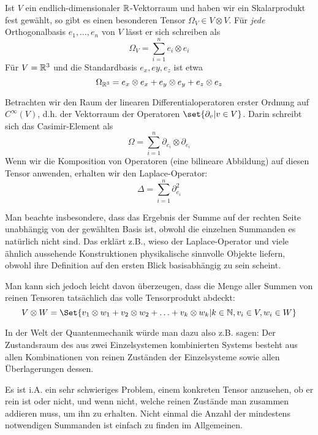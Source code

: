 \begin{example}\label{tensoren:casimir_element}
Ist $V$ ein endlich-dimensionaler $\mathbb{R}$-Vektorraum und haben wir ein Skalarprodukt fest gewählt, so gibt es einen besonderen Tensor $\Omega_V \in V\otimes V$. Für \textit{jede} Orthogonalbasis $e_1, \ldots, e_n$ von $V$ lässt er sich schreiben als
\[\Omega_V = \sum_{i=1}^n e_i \otimes e_i\]
Für $V=\mathbb{R}^3$ und die Standardbasis $e_x, ey, e_z$ ist etwa
\[\Omega_{\mathbb{R}^3} = e_x\otimes e_x + e_y\otimes e_y + e_z\otimes e_z\]

Betrachten wir den Raum der linearen Differentialoperatoren erster Ordnung auf $C^\infty(V)$, d.h. der Vektorraum der Operatoren $\set{\partial_v | v\in V}$. Darin schreibt sich das Casimir-Element als
\[\Omega = \sum_{i=1}^n \partial_{e_i} \otimes \partial_{e_i}\]
Wenn wir die Komposition von Operatoren (eine bilineare Abbildung) auf diesen Tensor anwenden, erhalten wir den Laplace-Operator:
\[\Delta = \sum_{i=1}^n \partial_{e_i}^2\]

Man beachte insbesondere, dass das Ergebnis der Summe auf der rechten Seite unabhängig von der gewählten Basis ist, obwohl die einzelnen Summanden es natürlich nicht sind. Das erklärt z.B., wieso der Laplace-Operator und viele ähnlich aussehende Konstruktionen physikalische sinnvolle Objekte liefern, obwohl ihre Definition auf den ersten Blick basisabhängig zu sein scheint.
\end{example}

\begin{remark}
Man kann sich jedoch leicht davon überzeugen, dass die Menge aller Summen von reinen Tensoren tatsächlich das volle Tensorprodukt abdeckt:
\[V\otimes W = \Set{v_1\otimes w_1 + v_2\otimes w_2 + \ldots + v_k\otimes w_k | k\in\IN, v_i\in V, w_i\in W}\]

In der Welt der Quantenmechanik würde man dazu also z.B. sagen: Der Zustandsraum des aus zwei Einzelsystemen kombinierten Systems besteht aus allen Kombinationen von reinen Zuständen der Einzelsysteme sowie allen Überlagerungen dessen.

Es ist i.A. ein sehr schwieriges Problem, einem konkreten Tensor anzusehen, ob er rein ist oder nicht, und wenn nicht, welche reinen Zustände man zusammen addieren muss, um ihn zu erhalten. Nicht einmal die Anzahl der mindestens notwendigen Summanden ist einfach zu finden im Allgemeinen.
\end{remark}

